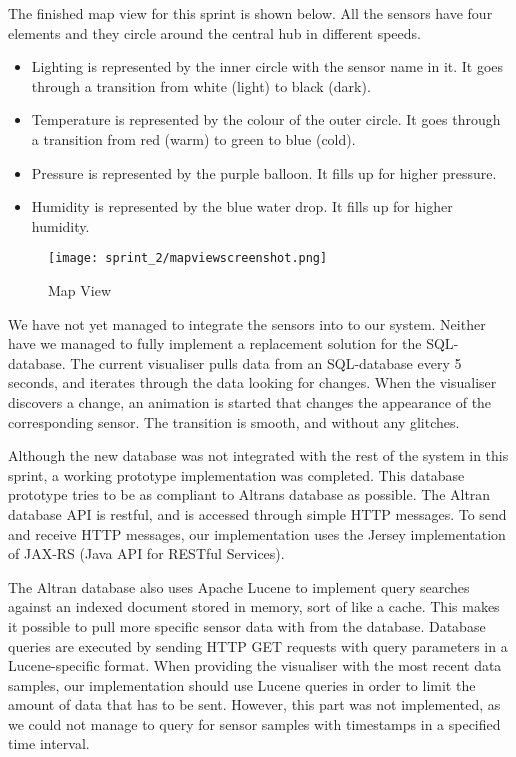 \documentclass[../document]{subfiles}
\begin{document}
The finished map view for this sprint is shown below. All the sensors have four elements and they circle around the central hub in different speeds.

\begin{itemize}
\item
Lighting is represented by the inner circle with the sensor name in it. It goes through a transition from white (light) to black (dark).
\item
Temperature is represented by the colour of the outer circle. It goes through a transition from red (warm) to green to blue (cold).
\item
Pressure is represented by the purple balloon. It fills up for higher pressure.
\item
Humidity is represented by the blue water drop. It fills up for higher humidity.
\end{itemize}

\begin{figure}[H]
	\centering
	\texttt{[image: sprint\_2/mapviewscreenshot.png]}
	\caption{Map View}
\end{figure}

We have not yet managed to integrate the sensors into to our system. Neither have we managed to fully implement a replacement solution for the \gls{SQL}-database. The current visualiser pulls data from an \gls{SQL}-database every 5 seconds, and iterates through the data looking for changes. When the visualiser discovers a change, an animation is started that changes the appearance of the corresponding sensor. The transition is smooth, and without any glitches.

Although the new database was not integrated with the rest of the system in this sprint, a working prototype implementation was completed. This database prototype tries to be as compliant to Altrans database as possible. The \gls{Altran} database \gls{API} is restful, and is accessed through simple \gls{HTTP} messages. To send and receive \gls{HTTP} messages, our implementation uses the Jersey implementation of JAX-RS (\gls{Java} \gls{API} for RESTful Services).

The \gls{Altran} database also uses Apache Lucene to implement query searches against an indexed document stored in memory, sort of like a cache. This makes it possible to pull more specific sensor data with from the database. Database queries are executed by sending \gls{HTTP} GET requests with query parameters in a Lucene-specific format. When providing the visualiser with the most recent data samples, our implementation should use Lucene queries in order to limit the amount of data that has to be sent. However, this part was not implemented, as we could not manage to query for sensor samples with timestamps in a specified time interval.
\end{document}
